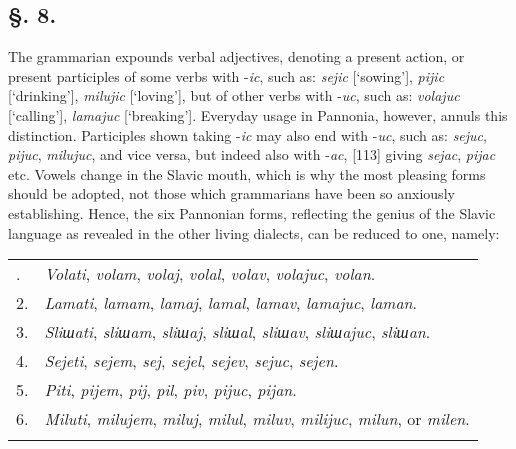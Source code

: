 \subsection*{\hspace*{\fill}§. 8.\hspace*{\fill}}

The grammarian expounds verbal adjectives, denoting a present action, or pre\-sent participles of some verbs with -\textit{ic}, such as: \textit{sejic} [‘sowing’], \textit{pijic} [‘drinking’], \textit{milujic} [‘loving’], but of other verbs with -\textit{uc}, such as: \textit{volajuc} [‘calling’], \textit{lamajuc} [‘breaking’]. Everyday usage in Pannonia, however, annuls this distinction. Participles shown taking -\textit{ic} may also end with -\textit{uc}, such as: \textit{sejuc}, \textit{pijuc}, \textit{milujuc}, and vice versa, but indeed also with -\textit{ac}, [113] giving \textit{sejac}, \textit{pijac} etc. Vowels change in the Slavic mouth, which is why the most pleasing forms should be adopted, not those which grammarians have been so anxiously establishing. Hence, the six Pannonian forms, reflecting the genius of the Slavic language as revealed in the other living dialects, can be reduced to one, namely:

\begin{longtable}{ l l }
    \lsptoprule
    1. & \textit{Volati}, \textit{volam}, \textit{volaj}, \textit{volal}, \textit{volav}, \textit{volajuc}, \textit{volan}. \\
    2. & \textit{Lamati}, \textit{lamam}, \textit{lamaj}, \textit{lamal}, \textit{lamav}, \textit{lamajuc}, \textit{laman}. \\
    3. & \textit{Sliшati}, \textit{sliшam}, \textit{sliшaj}, \textit{sliшal}, \textit{sliшav}, \textit{sliшajuc}, \textit{sliшan}. \\
    4. & \textit{Sejeti}, \textit{sejem}, \textit{sej}, \textit{sejel}, \textit{sejev}, \textit{sejuc}, \textit{sejen}. \\
    5. & \textit{Piti}, \textit{pijem}, \textit{pij}, \textit{pil}, \textit{piv}, \textit{pijuc}, \textit{pijan}. \\
    6. & \textit{Miluti}, \textit{milujem}, \textit{miluj}, \textit{milul}, \textit{miluv}, \textit{milijuc}, \textit{milun}, or \textit{milen}. \\
    \lspbottomrule
\end{longtable}

